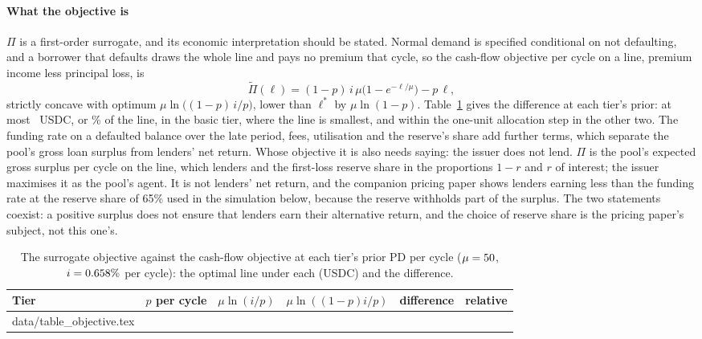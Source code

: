 \documentclass[preprint,11pt,authoryear]{elsarticle}
\makeatletter
\newcommand{\inputrows}[1]{\@@input #1 }
\makeatother
\begin{document}
\paragraph{What the objective is} $\Pi$ is a first-order surrogate, and its economic interpretation
should be stated. Normal demand is specified conditional on not defaulting, and a borrower that
defaults draws the whole line and pays no premium that cycle, so the cash-flow objective per cycle
on a line, premium income less principal loss, is
\[
  \tilde\Pi(\ell)=(1-p)\,i\,\mu\bigl(1-e^{-\ell/\mu}\bigr)-p\,\ell,
\]
strictly concave with optimum $\mu\ln\bigl((1-p)\,i/p\bigr)$, lower than $\ell^*$ by $\mu\ln(1-p)$.
Table~\ref{tab:objective} gives the difference at each tier's prior: at most \LineShiftMaxAbs\ USDC,
or \LineShiftMaxRel\% of the line, in the basic tier, where the line is smallest, and within the
one-unit allocation step in the other two. The funding rate on a defaulted balance over the late
period, fees, utilisation and the reserve's share add further terms, which separate the pool's gross
loan surplus from lenders' net return. Whose objective it is also needs saying: the issuer does not
lend. $\Pi$ is the pool's expected gross surplus per cycle on the line, which lenders and the
first-loss reserve share in the proportions $1-r$ and $r$ of interest; the issuer maximises it as the
pool's agent. It is not lenders' net return, and the companion pricing paper
\citep{pricingreserve2026} shows lenders earning less than the funding rate at the reserve share of
65\% used in the simulation below, because the reserve withholds part of the surplus. The two
statements coexist: a positive surplus does not ensure that lenders earn their alternative return,
and the choice of reserve share is the pricing paper's subject, not this one's.

\begin{table}[ht]
  \centering\small
  \caption{The surrogate objective against the cash-flow objective at each tier's prior PD per
  cycle ($\mu=50$, $i=0.658\%$ per cycle): the optimal line under each (USDC)
  and the difference.}
  \label{tab:objective}
  \begin{tabular}{lrrrrr}
    \toprule
    Tier & $p$ per cycle & $\mu\ln(i/p)$ & $\mu\ln((1-p)i/p)$ & difference & relative \\
    \midrule
    \inputrows{data/table_objective.tex}
    \bottomrule
  \end{tabular}
\end{table}
\end{document}
